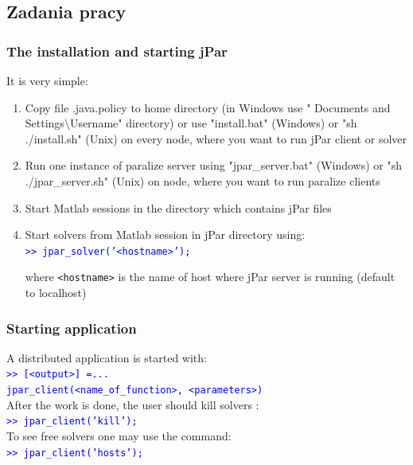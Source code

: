 \documentclass{beamer}
\begin{document}
\begin{frame}[fragile]
\end{frame}
\begin{frame}[fragile]
\section{Zadania pracy}
\frametitle{The installation and starting jPar}
It is very simple:
\begin{enumerate}
\item Copy file .java.policy to home directory (in Windows use
   " Documents and Settings$\setminus$Username" directory) or use "install.bat" (Windows)
   or "sh ./install.sh" (Unix) on every node, where you want to run
   jPar client or solver
\item Run one instance of paralize server using "jpar\_server.bat" (Windows)
   or "sh ./jpar\_server.sh" (Unix) on node, where you want to run paralize
   clients
\item Start Matlab sessions in the directory which contains
   jPar files
\item Start solvers from Matlab session in jPar directory
   using:\\

   \textcolor{blue}{\tt >> jpar\_solver('<hostname>');}

   where {\tt <hostname>} is the name of host where jPar server is running
   (default to localhost)\\
\end{enumerate}
\end{frame}
\begin{frame}
\frametitle{Starting application}
A distributed application is started with:\\
\vskip 0.2cm
\textcolor{blue}{\tt >> [<output>] =...}\\
 \hspace{0.5cm} \textcolor{blue}{\tt jpar\_client(<name\_of\_function>, <parameters>)}  \\
\vskip 0.2cm
After the work is done, the user should kill solvers :\\
\vskip 0.2cm
\textcolor{blue}   {\tt >> jpar\_client('kill');}\\
\vskip 0.2cm
To see free solvers one may use the command:\\
\vskip 0.2cm
 \textcolor{blue}   {\tt >> jpar\_client('hosts');}

\end{frame}
\end{document}
